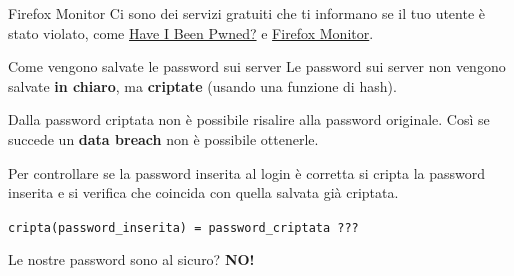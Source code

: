 \begin{myframe}{Firefox Monitor}
  Ci sono dei servizi gratuiti che ti informano se il tuo utente è stato violato, come \href{https://haveibeenpwned.com/}{Have I Been Pwned?} e \href{https://monitor.firefox.com/}{Firefox Monitor}.
\end{myframe}

\begin{myframe}{Come vengono salvate le password sui server}
  Le password sui server non vengono salvate \textbf{in chiaro}, ma \textbf{criptate} (usando una funzione di hash).

  \pause\medskip
  Dalla password criptata non è possibile risalire alla password originale. Così se succede un \textbf{data breach} non è possibile ottenerle.

  \pause\medskip
  Per controllare se la password inserita al login è corretta si cripta la password inserita e si verifica che coincida con quella salvata già criptata.

  \texttt{cripta(password\_inserita) = password\_criptata ???}
\end{myframe}

\begin{myframe}{Le nostre password sono al sicuro?}
  \pause
  {\Huge\textbf{NO!}}
  \pause
\end{myframe}

